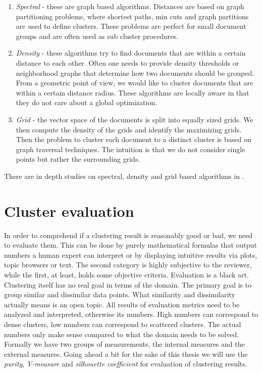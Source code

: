       \begin{enumerate}
        \item \emph{Spectral} - these are graph based algorithms. Distances are based on graph partitioning problems, where shortest paths, min cuts and graph partitions are used to define clusters. These problems are perfect for small document groups and are often used as sub cluster procedures.
        \item \emph{Density} - these algorithms try to find documents that are within a certain distance to each other. Often one needs to provide density thresholds or neighborhood graphs that determine how two documents should be grouped. From a geometric point of view, we would like to cluster documents that are within a certain distance radius. These algorithms are locally aware in that they do not care about a global optimization.
        \item \emph{Grid} - the vector space of the documents is split into equally sized grids. We then compute the density of the grids and identify the maximizing grids. Then the problem to cluster each document to a distinct cluster is based on graph traversal techniques. The intuition is that we do not consider single points but rather the surrounding grids.
      \end{enumerate}

    There are in depth studies on spectral, density and grid based algorithms in \cite{ClusteringBooAggarwalk2013}.


\section{Cluster evaluation}
\label{sec:evaluation}

  In order to comprehend if a clustering result is reasonably good or bad, we need to evaluate them. This can be done by purely mathematical formulas that output numbers a human expert can interpret or by displaying intuitive results via plots, topic browsers or text. The second category is highly subjective to the reviewer, while the first, at least, holds some objective criteria. Evaluation is a black art. Clustering itself has no real goal in terms of the domain. The primary goal is to group similar and dissimilar data points. What similarity and dissimilarity actually means is an open topic. All results of evaluation metrics need to be analyzed and interpreted, otherwise its numbers. High numbers can correspond to dense clusters, low numbers can correspond to scattered clusters. The actual numbers only make sense compared to what the domain needs to be solved.\\
  Formally we have two groups of measurements, the internal measures and the external measures. Going ahead a bit for the sake of this thesis we will use the \emph{purity}, \emph{V-measure} and \emph{silhouette coefficient} for evaluation of clustering results.

